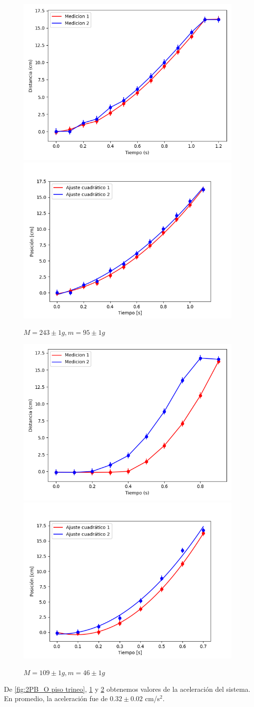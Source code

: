 \documentclass[12pt,a4]{article}
\begin{document}
\begin{figure}[H]
    \centering
    \includegraphics[width=0.4\linewidth]{TiempoVsDistanciaPisoMaderaMPB_O.png}
    \includegraphics[width=0.44\linewidth]{ajuste2_PisoMaderaMPB_O.png}
    \caption{$M = 243 \pm 1 g, m = 95 \pm 1 g$}
    \label{fig:M_OP piso trineo}
\end{figure}

\begin{figure}[H]
    \centering
    \includegraphics[width=0.4\linewidth]{TiempoVsDistanciaPisoMaderaV_2P.png}
    \includegraphics[width=0.44\linewidth]{ajuste2_PisoMaderaV_2P.png}
    \caption{$M = 109 \pm 1 g, m = 46 \pm 1 g$}
    \label{fig:V_2P piso trineo}
\end{figure}


De \ref{fig:2PB_O piso trineo}, \ref{fig:M_OP piso trineo} y \ref{fig:V_2P piso trineo} obtenemos valores de la aceleración del sistema. En promedio, la aceleración fue de $0.32 \pm 0.02$ cm/s\(^2\).
\end{document}

